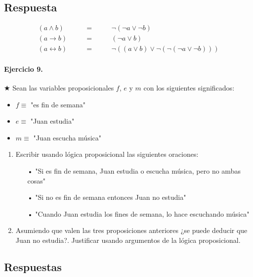 \documentclass[a4paper]{article}
\begin{document}
\subsection*{Respuesta}
\begin{align*}
 (a \wedge b) \qquad  &= \qquad & \neg (\neg a \vee \neg b) \\
 (a \rightarrow b) \qquad  &= \qquad &( \neg a \vee b)\\
 (a \leftrightarrow b) \qquad &= \qquad &\neg ((a \vee b) \vee \neg (\neg (\neg a \vee \neg b)))
\end{align*}

\paragraph{\textbf{Ejercicio 9.}} $\bigstar$ Sean las variables proposicionales $f$, $e$ y $m$ con los siguientes significados:
\begin{multicols}{3}
\begin{itemize}
\item $ f \equiv$ "es fin de semana"
\item $ e \equiv$ "Juan estudia"
\item $ m \equiv$ "Juan escucha música"
\end{itemize}
\end{multicols}

\begin{enumerate}[label=\alph*)]
\item Escribir usando lógica proposicional las siguientes oraciones:\\
\begin{itemize}
\item[•] "Si es fin de semana, Juan estudia o escucha música, pero no ambas cosas"
\item[•] "Si no es fin de semana entonces Juan no estudia"
\item[•] "Cuando Juan estudia los fines de semana, lo hace escuchando música"
\end{itemize}
\item Asumiendo que valen las tres proposiciones anteriores ¿se puede deducir que Juan no estudia?. Justificar usando argumentos de la lógica proposicional.
\end{enumerate}

\subsection*{Respuestas}
\end{document}
